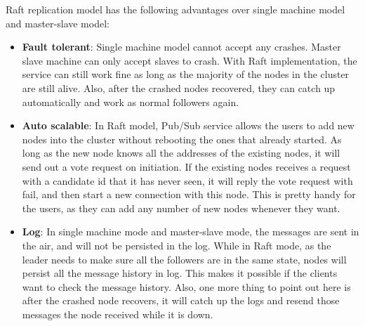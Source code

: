 Raft replication model has the following advantages over single machine model and master-slave model:

\begin{itemize}
  \item \textbf{Fault tolerant}: Single machine model cannot accept any crashes. Master slave machine can only accept slaves to crash. With Raft implementation, the service can still work fine as long as the majority of the nodes in the cluster are still alive. Also, after the crashed nodes recovered, they can catch up automatically and work as normal followers again.
  \item \textbf{Auto scalable}: In Raft model, Pub/Sub service allows the users to add new nodes into the cluster without rebooting the ones that already started. As long as the new node knows all the addresses of the existing nodes, it will send out a vote request on initiation. If the existing nodes receives a request with a candidate id that it has never seen, it will reply the vote request with fail, and then start a new connection with this node. This is pretty handy for the users, as they can add any number of new nodes whenever they want.
  \item \textbf{Log}: In single machine mode and master-slave mode, the messages are sent in the air, and will not be persisted in the log. While in Raft mode, as the leader needs to make sure all the followers are in the same state, nodes will persist all the message history in log. This makes it possible if the clients want to check the message history. Also, one more thing to point out here is after the crashed node recovers, it will catch up the logs and resend those messages the node received while it is down.
\end{itemize}

